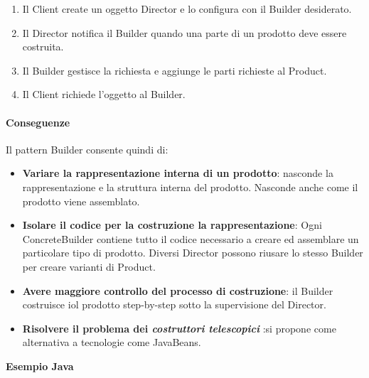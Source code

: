 \begin{enumerate}
    \item Il Client create un oggetto Director e lo configura con il Builder desiderato. 
    \item Il Director notifica il Builder quando una parte di un prodotto deve essere costruita.
    \item Il Builder gestisce la richiesta e aggiunge le parti richieste al Product.
    \item Il Client richiede l'oggetto al Builder.
\end{enumerate}

\paragraph{Conseguenze} Il pattern Builder consente quindi di:
\begin{itemize}
    \item \textbf{Variare la rappresentazione interna di un prodotto}: nasconde la rappresentazione e la struttura interna del prodotto. Nasconde anche come il prodotto viene assemblato.
    \item \textbf{Isolare il codice per la costruzione la rappresentazione}: Ogni ConcreteBuilder contiene tutto il codice necessario a creare ed assemblare un particolare tipo di prodotto. Diversi Director possono riusare lo stesso Builder per creare varianti di Product.
    \item \textbf{Avere maggiore controllo del processo di costruzione}: il Builder costruisce iol prodotto step-by-step sotto la supervisione del Director.
    \item \textbf{Risolvere il problema dei \textit{costruttori telescopici}} :si propone come alternativa a tecnologie come JavaBeans.
\end{itemize}



\newpage

\textbf{Esempio Java}

